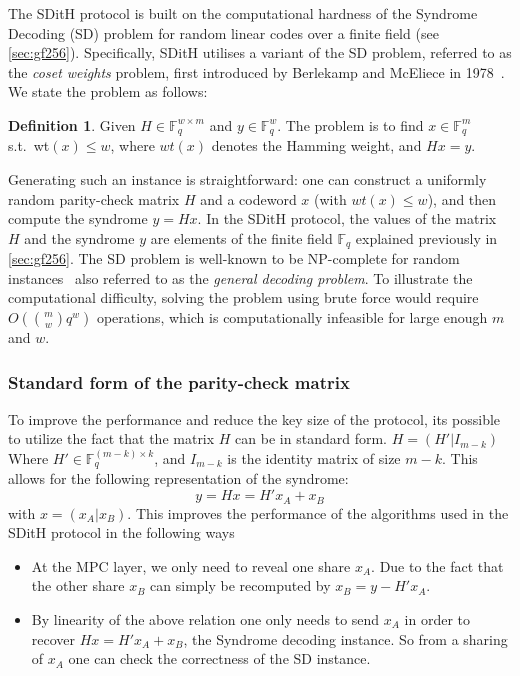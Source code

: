 \documentclass[11pt]{report}
\theoremstyle{definition}
\newtheorem{definition}{Definition}[section]
\theoremstyle{plain}
\begin{document}
The SDitH protocol is built on the computational hardness of the Syndrome Decoding (SD) problem for random linear codes over a finite field (see \autoref{sec:gf256}). Specifically, SDitH utilises a variant of the SD problem, referred to as the \textit{coset weights} problem, first introduced by Berlekamp and McEliece in 1978~\cite{berlekamp1978inherent}. We state the problem as follows:

\begin{definition}\label{def:syndrome}
  Given $H \in \mathbb{F}^{w\times m}_q$ and $y \in \mathbb{F}^{w}_q$. The problem is to find $x \in \mathbb{F}^m_q$ s.t.\ wt$(x) \leq w$, where $wt(x)$ denotes the Hamming weight, and $Hx = y$.
\end{definition}

Generating such an instance is straightforward: one can construct a uniformly random parity-check matrix $H$ and a codeword $x$ (with $wt(x) \leq w$), and then compute the syndrome $y = Hx$. In the SDitH protocol, the values of the matrix $H$ and the syndrome $y$ are elements of the finite field $\mathbb{F}_q$ explained previously in \autoref{sec:gf256}. The SD problem is well-known to be NP-complete for random instances~\cite{berlekamp1978inherent} also referred to as the \textit{general decoding problem}. To illustrate the computational difficulty, solving the problem using brute force would require $O(\binom{m}{w} q^w)$ operations, which is computationally infeasible for large enough $m$ and $w$.

\subsubsection{Standard form of the parity-check matrix}\label{sub:standard_form_of_the_parity_check_matrix}
To improve the performance and reduce the key size of the protocol, its possible to utilize the fact that the matrix $H$ can be in standard form. $H = (H'|I_{m-k}) $ Where $H' \in \mathbb{F}^{(m-k)\times k}_q$, and $I_{m-k}$ is the identity matrix of size $m-k$. This allows for the following representation of the syndrome:
\begin{equation}
  y = Hx = H'x_A + x_B\label{eq:standard_form_of_the_parity_check_matrix}
\end{equation}
with $x = (x_A | x_B)$. This improves the performance of the algorithms used in the SDitH protocol in the following ways
\begin{itemize}
  \item At the MPC layer, we only need to reveal one share $x_A$. Due to the fact that the other share $x_B$ can simply be recomputed by $x_B = y - H'x_A$.
  \item By linearity of the above relation one only needs to send $x_A$ in order to recover $Hx = H'x_A + x_B$, the Syndrome decoding instance. So from a sharing of $x_A$ one can check the correctness of the SD instance.
\end{itemize}
\end{document}
